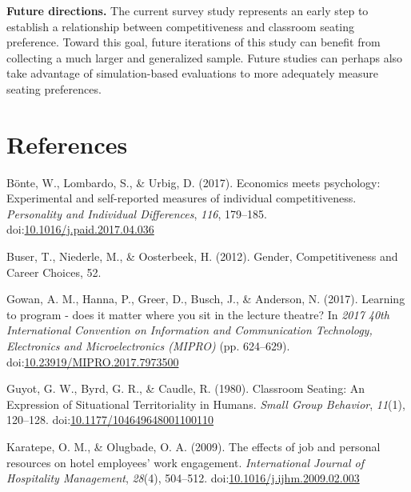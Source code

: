 \documentclass[man]{apa6}
\begin{document}
\textbf{Future directions.} The current survey study represents an early step to establish a relationship between competitiveness and classroom seating preference. Toward this goal, future iterations of this study can benefit from collecting a much larger and generalized sample. Future studies can perhaps also take advantage of simulation-based evaluations to more adequately measure seating preferences.

\newpage

\hypertarget{references}{%
\section{References}\label{references}}

\begingroup
\setlength{\parindent}{-0.5in}
\setlength{\leftskip}{0.5in}

\hypertarget{refs}{}
\leavevmode\hypertarget{ref-bonte_economics_2017}{}%
Bönte, W., Lombardo, S., \& Urbig, D. (2017). Economics meets psychology: Experimental and self-reported measures of individual competitiveness. \emph{Personality and Individual Differences}, \emph{116}, 179--185. doi:\href{https://doi.org/10.1016/j.paid.2017.04.036}{10.1016/j.paid.2017.04.036}

\leavevmode\hypertarget{ref-buser_gender_2012}{}%
Buser, T., Niederle, M., \& Oosterbeek, H. (2012). Gender, Competitiveness and Career Choices, 52.

\leavevmode\hypertarget{ref-gowan_learning_2017}{}%
Gowan, A. M., Hanna, P., Greer, D., Busch, J., \& Anderson, N. (2017). Learning to program - does it matter where you sit in the lecture theatre? In \emph{2017 40th International Convention on Information and Communication Technology, Electronics and Microelectronics (MIPRO)} (pp. 624--629). doi:\href{https://doi.org/10.23919/MIPRO.2017.7973500}{10.23919/MIPRO.2017.7973500}

\leavevmode\hypertarget{ref-guyot_classroom_1980}{}%
Guyot, G. W., Byrd, G. R., \& Caudle, R. (1980). Classroom Seating: An Expression of Situational Territoriality in Humans. \emph{Small Group Behavior}, \emph{11}(1), 120--128. doi:\href{https://doi.org/10.1177/104649648001100110}{10.1177/104649648001100110}

\leavevmode\hypertarget{ref-karatepe_effects_2009}{}%
Karatepe, O. M., \& Olugbade, O. A. (2009). The effects of job and personal resources on hotel employees' work engagement. \emph{International Journal of Hospitality Management}, \emph{28}(4), 504--512. doi:\href{https://doi.org/10.1016/j.ijhm.2009.02.003}{10.1016/j.ijhm.2009.02.003}
\end{document}
